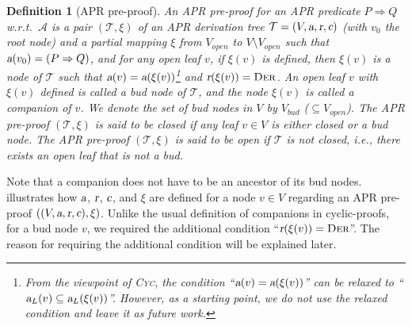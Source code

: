 \documentclass[10pt,a4paper]{article}
\newtheorem{definition}[theorem]{Definition}
\def\cA{\mathcal{A}}
\def\cT{\mathcal{T}}
\newcommand{\ReachPred}[2]{#1 \Rightarrow #2}
\newcommand{\RuleName}[1]{{\rm \textsc{#1}}}
\newcommand{\varsl}[1]{\mbox{\sl #1}}
\def\Vbud{V_{\mathit{bud}}}
\def\Vopen{V_{\mathit{open}}}
\begin{document}
\begin{definition}[APR pre-proof]
	\label{def:APR-pre-proof}
	An \emph{APR pre-proof} for an APR predicate $\ReachPred{P}{Q}$ w.r.t.\ $\cA$ is a pair $(\cT,\xi)$ of an APR derivation tree $\cT=(V,\varsl{a},\varsl{r},\varsl{c})$ (with $v_0$ the root node) and a partial mapping $\xi$ from $\Vopen$ to $V\setminus \Vopen$
	such that
	$\varsl{a}(v_0) = (\ReachPred{P}{Q})$,
	and
	for any open leaf $v$, if $\xi(v)$ is defined, then
	$\xi(v)$ is a node of $\cT$ such that $\varsl{a}(v)=\varsl{a}(\xi(v))$\footnote{\label{fnt:relaxation-of-bud-companion-relationships}
		From the viewpoint of \RuleName{Cyc}, the condition ``$\varsl{a}(v)=\varsl{a}(\xi(v))$'' can be relaxed to
		``$\varsl{a}_L(v) \subseteq \varsl{a}_L(\xi(v))$''.
		However, as a starting point, we do not use the relaxed condition and leave it as future work.}
	and $\varsl{r}(\xi(v)) = \mbox{\rm\RuleName{Der}}$.
	An open leaf $v$ with $\xi(v)$ defined is called a \emph{bud} node of $\cT$, and the node $\xi(v)$ is called a \emph{companion} of $v$.
	We denote the set of bud nodes in $V$ by $\Vbud$ ($\subseteq \Vopen$).
	The APR pre-proof $(\cT,\xi)$ is said to be \emph{closed} if
	any leaf $v \in V$ is either closed or a bud node.
	The APR pre-proof $(\cT,\xi)$ is said to be \emph{open} if $\cT$ is not closed, i.e., there exists an open leaf that is not a bud.
\end{definition}
Note that a companion does not have to be an ancestor of its bud nodes.
 illustrates how $\varsl{a}$, $\varsl{r}$, $\varsl{c}$, and $\xi$ are defined for a node $v \in V$ regarding an APR pre-proof $((V,\varsl{a},\varsl{r},\varsl{c}),\xi)$.
Unlike the usual definition of companions in cyclic-proofs, for a bud node $v$, we required the additional condition ``$\varsl{r}(\xi(v)) = \mbox{\rm\RuleName{Der}}$''.
The reason for requiring the additional condition will be explained later.
\end{document}

